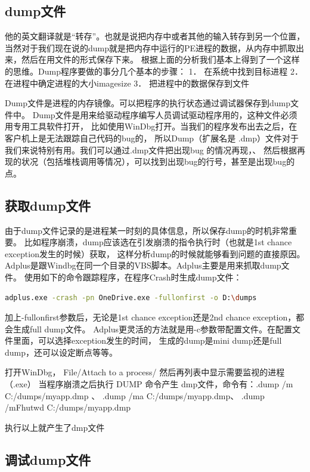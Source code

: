 \documentclass{book}
\begin{document}
\subsection{dump文件}

他的英文翻译就是“转存”。也就是说把内存中或者其他的输入转存到另一个位置，
当然对于我们现在说的dump就是把内存中运行的PE进程的数据，从内存中抓取出来，然后在用文件的形式保存下来。 
根据上面的分析我们基本上得到了一个这样的思维。Dump程序要做的事分几个基本的步骤： 
1．  在系统中找到目标进程 
2．  在进程中确定进程的大小imagesize 
3．  把进程中的数据保存到文件 

Dump文件是进程的内存镜像。可以把程序的执行状态通过调试器保存到dump文件中。
Dump文件是用来给驱动程序编写人员调试驱动程序用的，这种文件必须用专用工具软件打开，
比如使用WinDbg打开。当我们的程序发布出去之后，在客户机上是无法跟踪自己代码的bug的，
所以Dump（扩展名是 .dmp）文件对于我们来说特别有用。我们可以通过.dmp文件把出现bug 的情况再现，、
然后根据再现的状况（包括堆栈调用等情况），可以找到出现bug的行号，甚至是出现bug的点。

\subsection{获取dump文件}

由于dump文件记录的是进程某一时刻的具体信息，所以保存dump的时机非常重要。
比如程序崩溃，dump应该选在引发崩溃的指令执行时（也就是1st chance exception发生的时候）获取，
这样分析dump的时候就能够看到问题的直接原因。
Adplus是跟Windbg在同一个目录的VBS脚本。Adplus主要是用来抓取dump文件。
使用如下的命令跟踪程序，在程序Crash时生成dump文件：

\begin{lstlisting}[language=Bash]
adplus.exe -crash -pn OneDrive.exe -fullonfirst -o D:\dumps
\end{lstlisting}

加上-fullonfirst参数后，无论是1st chance exception还是2nd chance exception，都会生成full dump文件。
Adplus更灵活的方法就是用-c参数带配置文件。在配置文件里面，可以选择exception发生的时间，
生成的dump是mini dump还是full dump，还可以设定断点等等。

打开WinDbg， File/Attach to a process/  然后再列表中显示需要监视的进程（.exe）
当程序崩溃之后执行 DUMP 命令产生 dmp文件，命令有：.dump /m C:/dumps/myapp.dmp 、
.dump /ma C:/dumps/myapp.dmp、 .dump /mFhutwd C:/dumps/myapp.dmp

执行以上就产生了dmp文件

\subsection{调试dump文件}
\end{document}
